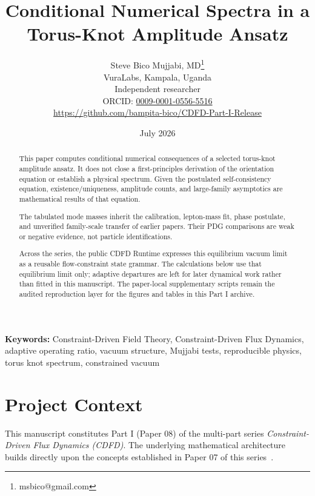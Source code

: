 \documentclass[11pt]{article}
\begin{document}
\title{Conditional Numerical Spectra in a Torus-Knot Amplitude Ansatz}

\author{Steve Bico Mujjabi, MD\thanks{msbico@gmail.com}\\
VuraLabs, Kampala, Uganda\\
Independent researcher\\
ORCID: \href{https://orcid.org/0009-0001-0556-5516}{0009-0001-0556-5516}\\
\url{https://github.com/bampita-bico/CDFD-Part-I-Release}}

\date{July 2026}

\maketitle

\begin{abstract}
This paper computes conditional numerical consequences of a selected
torus-knot amplitude ansatz. It does not close a first-principles derivation of
the orientation equation or establish a physical spectrum. Given the postulated
self-consistency equation, existence/uniqueness, amplitude counts, and
large-family asymptotics are mathematical results of that equation.

The tabulated mode masses inherit the calibration, lepton-mass fit, phase
postulate, and unverified family-scale transfer of earlier papers. Their PDG
comparisons are weak or negative evidence, not particle identifications.

Across the series, the public CDFD Runtime expresses this equilibrium vacuum
limit as a reusable flow-constraint state grammar. The calculations below use
that equilibrium limit only; adaptive departures are left for later dynamical
work rather than fitted in this manuscript. The paper-local supplementary
scripts remain the audited reproduction layer for the figures and tables in
this Part I archive.
\end{abstract}

\noindent\textbf{Keywords:} Constraint-Driven Field Theory, Constraint-Driven Flux Dynamics, adaptive operating ratio, vacuum structure, Mujjabi tests, reproducible physics, torus knot spectrum, constrained vacuum

\vspace{0.75em}
\linenumbers

\section*{Project Context}
This manuscript constitutes Part I (Paper 08) of the multi-part series
\textit{Constraint-Driven Flux Dynamics (CDFD)}. The underlying mathematical
architecture builds directly upon the concepts established in Paper 07 of this
series~\cite{MujjabiVII2026}.
\end{document}

